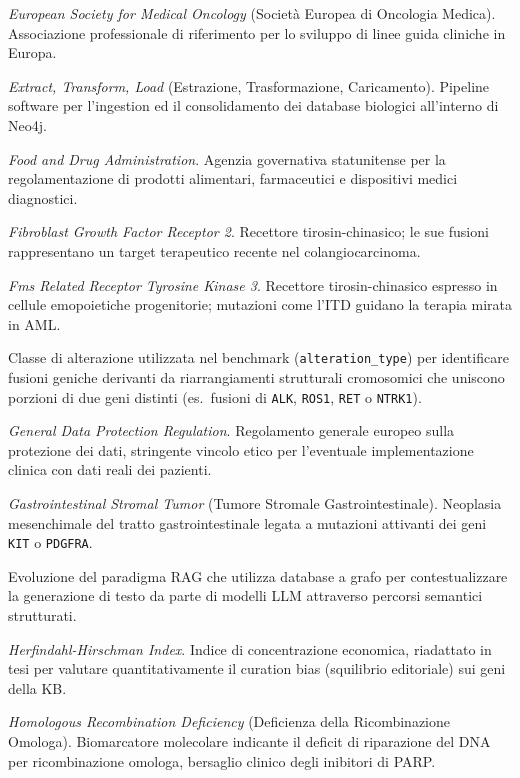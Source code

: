 \documentclass[11pt,a4paper]{article}
\newcommand{\code}[1]{\texttt{\small #1}}
\begin{document}
\begin{description}[leftmargin=1.4em,style=nextline]
\item[ESMO] \emph{European Society for Medical Oncology} (Società Europea di Oncologia Medica). Associazione professionale di riferimento per lo sviluppo di linee guida cliniche in Europa.
\item[ETL] \emph{Extract, Transform, Load} (Estrazione, Trasformazione, Caricamento). Pipeline software per l'ingestion ed il consolidamento dei database biologici all'interno di Neo4j.
\item[FDA] \emph{Food and Drug Administration}. Agenzia governativa statunitense per la regolamentazione di prodotti alimentari, farmaceutici e dispositivi medici diagnostici.
\item[FGFR2] \emph{Fibroblast Growth Factor Receptor 2}. Recettore tirosin-chinasico; le sue fusioni rappresentano un target terapeutico recente nel colangiocarcinoma.
\item[FLT3] \emph{Fms Related Receptor Tyrosine Kinase 3}. Recettore tirosin-chinasico espresso in cellule emopoietiche progenitorie; mutazioni come l'ITD guidano la terapia mirata in AML.
\item[fusion] Classe di alterazione utilizzata nel benchmark (\code{alteration\_type}) per identificare fusioni geniche derivanti da riarrangiamenti strutturali cromosomici che uniscono porzioni di due geni distinti (es.\ fusioni di \code{ALK}, \code{ROS1}, \code{RET} o \code{NTRK1}).
\item[GDPR] \emph{General Data Protection Regulation}. Regolamento generale europeo sulla protezione dei dati, stringente vincolo etico per l'eventuale implementazione clinica con dati reali dei pazienti.
\item[GIST] \emph{Gastrointestinal Stromal Tumor} (Tumore Stromale Gastrointestinale). Neoplasia mesenchimale del tratto gastrointestinale legata a mutazioni attivanti dei geni \code{KIT} o \code{PDGFRA}.
\item[GraphRAG] Evoluzione del paradigma RAG che utilizza database a grafo per contestualizzare la generazione di testo da parte di modelli LLM attraverso percorsi semantici strutturati.
\item[HHI] \emph{Herfindahl-Hirschman Index}. Indice di concentrazione economica, riadattato in tesi per valutare quantitativamente il curation bias (squilibrio editoriale) sui geni della KB.
\item[HRD] \emph{Homologous Recombination Deficiency} (Deficienza della Ricombinazione Omologa). Biomarcatore molecolare indicante il deficit di riparazione del DNA per ricombinazione omologa, bersaglio clinico degli inibitori di PARP.

\end{description}
\end{document}
